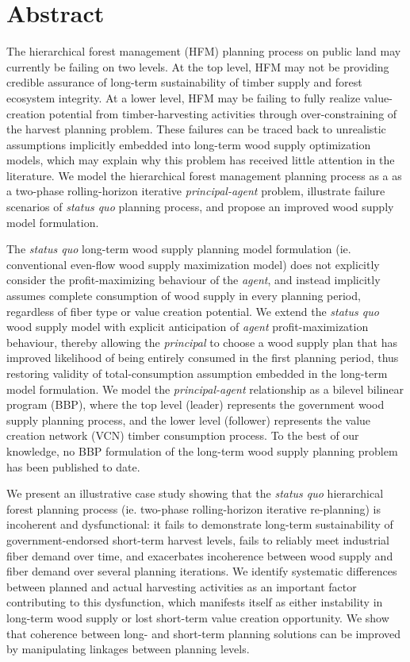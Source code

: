 \chapter*{Abstract}

The hierarchical forest management (HFM) planning process on public
land may currently be failing on two
levels\cite{paradis2013risk}. At the top level, HFM may not
be providing credible assurance of long-term sustainability of timber
supply and forest ecosystem integrity. At a lower level, HFM may be
failing to fully realize value-creation potential from
timber-harvesting activities through over-constraining of the harvest
planning problem. These failures can be traced back to unrealistic
assumptions implicitly embedded into long-term wood supply
optimization models, which may explain why this problem has received
little attention in the literature. We
model the hierarchical forest management planning process as a as a
two-phase rolling-horizon iterative \emph{principal-agent} problem,
illustrate failure scenarios of \emph{status quo} planning process,
and propose an improved wood supply model formulation.

The \emph{status quo} long-term wood supply planning model formulation
(ie. conventional even-flow wood supply maximization model) does not
explicitly consider the profit-maximizing behaviour of the \emph{agent},
and instead implicitly assumes complete consumption of wood supply in
every planning period, regardless of fiber type or value creation
potential. We extend the \emph{status quo} wood supply model with
explicit anticipation of \emph{agent} profit-maximization behaviour,
thereby allowing the \emph{principal} to choose a wood supply plan
that has improved likelihood of being entirely consumed in the first
planning period, thus restoring validity of total-consumption
assumption embedded in the long-term model formulation.  We model 
the \emph{principal-agent} relationship as a bilevel bilinear program (BBP),
where the top level (leader) represents the government wood supply
planning process, and the lower level (follower) represents the value
creation network (VCN) timber consumption process. To the best of our
knowledge, no BBP formulation of the long-term wood supply planning
problem has been published to date.

We present an illustrative case study showing that the \emph{status
  quo} hierarchical forest planning process (ie. two-phase
rolling-horizon iterative re-planning) is incoherent and
dysfunctional: it fails to demonstrate long-term sustainability of
government-endorsed short-term harvest levels, fails to reliably meet
industrial fiber demand over time, and exacerbates incoherence between
wood supply and fiber demand over several planning iterations. We
identify systematic differences between planned and actual harvesting
activities as an important factor contributing to this dysfunction,
which manifests itself as either instability in long-term wood supply
or lost short-term value creation opportunity. We show that coherence
between long- and short-term planning solutions can be improved
 by manipulating linkages between planning levels.
